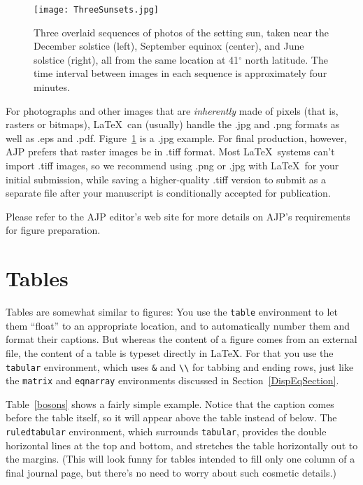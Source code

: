 \documentclass[prb,preprint]{revtex4-1}
\begin{document}
\begin{figure}[h!]
\centering
\texttt{[image: ThreeSunsets.jpg]}
\caption{Three overlaid sequences of photos of the setting sun, taken
near the December solstice (left), September equinox (center), and
June solstice (right), all from the same location at 41$^\circ$ north
latitude. The time interval between images in each sequence is approximately
four minutes.}
\label{sunsets}
\end{figure}

For photographs and other images that are \textit{inherently} made 
of pixels (that is, rasters or bitmaps), \LaTeX\ can 
(usually) handle the .jpg and .png formats as well as .eps and .pdf.  
Figure~\ref{sunsets} is a .jpg example. For final production, however, 
AJP prefers that raster images be in .tiff format.  Most \LaTeX\ systems 
can't import .tiff images, so we recommend using .png or .jpg with \LaTeX\ 
for your initial submission, while saving a higher-quality .tiff version 
to submit as a separate file after your manuscript is conditionally accepted
for publication.

Please refer to the AJP editor's web site\cite{editorsite} for more details 
on AJP's requirements for figure preparation.


\section{Tables}

Tables are somewhat similar to figures:  You use the \texttt{table} environment
to let them ``float'' to an appropriate location, and to automatically number
them and format their captions.  But whereas the content of a figure comes
from an external file, the content of a table is typeset directly in \LaTeX.
For that you use the \texttt{tabular} environment, which uses \verb/&/ and
\verb/\\/ for tabbing and ending rows, just like the \texttt{matrix} and
\texttt{eqnarray} environments discussed in Section~\ref{DispEqSection}.

Table~\ref{bosons} shows a fairly simple example.  Notice that the caption comes
before the table itself, so it will appear above the table instead of below.
The \texttt{ruledtabular} environment, which surrounds \texttt{tabular},
provides the double horizontal lines at the top and bottom, and stretches
the table horizontally out to the margins.  (This will look funny for tables
intended to fill only one column of a final journal page, but there's no 
need to worry about such cosmetic details.)
\end{document}

